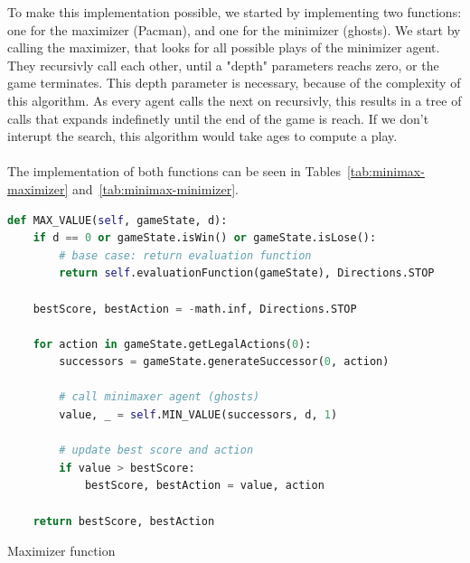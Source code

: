 \documentclass{article}
\begin{document}
To make this implementation possible, we started by implementing two functions: one for the maximizer (Pacman), and one for the minimizer (ghosts). We start by calling the maximizer, that looks for all possible plays of the minimizer agent. They recursivly call each other, until a "depth" parameters reachs zero, or the game terminates. This depth parameter is necessary, because of the complexity of this algorithm. As every agent calls the next on recursivly, this results in a tree of calls that expands indefinetly until the end of the game is reach. If we don't interupt the search, this algorithm would take ages to compute a play.
~\\
~\\
The implementation of both functions can be seen in Tables~\ref{tab:minimax-maximizer} and~\ref{tab:minimax-minimizer}.

\begin{table}[!ht]
\begin{lstlisting}[language=python, frame=tlbr, framesep=6pt, backgroundcolor=\color{light-gray}]
def MAX_VALUE(self, gameState, d):
    if d == 0 or gameState.isWin() or gameState.isLose():
        # base case: return evaluation function
        return self.evaluationFunction(gameState), Directions.STOP
    
    bestScore, bestAction = -math.inf, Directions.STOP

    for action in gameState.getLegalActions(0):
        successors = gameState.generateSuccessor(0, action)

        # call minimaxer agent (ghosts)
        value, _ = self.MIN_VALUE(successors, d, 1)

        # update best score and action
        if value > bestScore:
            bestScore, bestAction = value, action

    return bestScore, bestAction
  \end{lstlisting}
  \caption{Maximizer function}
  \label{tab:minimax-maximizer}
\end{table}
\end{document}
